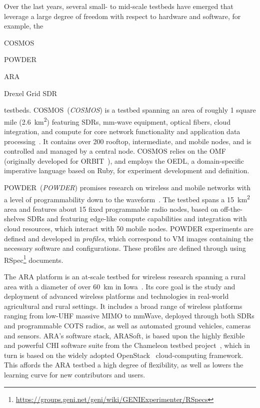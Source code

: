 Over the last years, several small- to mid-scale testbeds have emerged that leverage a large degree of freedom with respect to hardware and software, for example, the 
\begin{enumerate*}[itemjoin={{, }}, itemjoin*={{, and }}]
    \item \acs*{COSMOS}
    \item \acs*{POWDER}
    \item \acs*{ARA}
    \item Drexel Grid \ac{SDR}
\end{enumerate*} testbeds.
\acs{COSMOS}~(\emph{\acl{COSMOS}}) is a testbed spanning an area of roughly \num{1} square mile (\SI{2.6}{\kilo\meter\squared}) featuring \acp{SDR}, \si{\milli\meter}-wave equipment, optical fibers, cloud integration, and compute for core network functionality and application data processing~\cite{Cosmos1,cosmos2}.
It contains over \num{200} rooftop, intermediate, and mobile nodes, and is controlled and managed by a central node.
\ac{COSMOS} relies on the \ac{OMF} (originally developed for ORBIT~\cite{orbit}), and employs the \ac{OEDL}, a domain-specific imperative language based on Ruby, for experiment development and definition.

\acs{POWDER}~(\emph{\acl{POWDER}}) promises research on wireless and mobile networks with a level of programmability down to the waveform~\cite{powder}.
The testbed spans a \SI{15}{\kilo\meter\squared} area and features about \num{15} fixed programmable radio nodes, based on off-the-shelves \acp{SDR} and featuring edge-like compute capabilities and integration with cloud resources, which interact with \num{50} mobile nodes. 
\ac{POWDER} experiments are defined and developed in \emph{profiles}, which correspond to \ac{VM} images containing the necessary software and configurations.
These profiles are defined through using \ac{RSpec}\footnote{\url{https://groups.geni.net/geni/wiki/GENIExperimenter/RSpecs}} documents.

The \ac{ARA} platform is an at-scale testbed for wireless research spanning a rural area with a diameter of over \SI{60}{\kilo\meter} in Iowa~\cite{zhang2022ara}.
Its core goal is the study and deployment of advanced wireless platforms and technologies in real-world agricultural and rural settings.
It includes a broad range of wireless platforms ranging from low-\ac{UHF} massive \ac{MIMO} to \unit{\milli\meter}Wave, deployed through both \acp{SDR} and programmable \ac{COTS} radios, as well as automated ground vehicles, cameras and sensors.
\ac{ARA}'s software stack, ARASoft, is based upon the highly flexible and powerful \ac{CHI} software suite from the Chameleon testbed project~\cite{keahey2020lessons}, which in turn is based on the widely adopted OpenStack~\cite{openstack} cloud-computing framework.
This affords the \ac{ARA} testbed a high degree of flexibility, as well as lowers the learning curve for new contributors and users.

